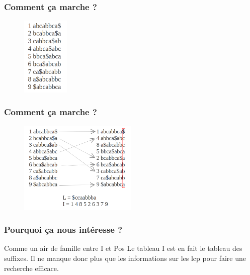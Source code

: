 \documentclass[10pt]{beamer}
\begin{document}
\begin{frame}
  \frametitle{Comment ça marche ?}
  \begin{figure}
    \includegraphics[width=0.2\textwidth]{3_burrows}
  \end{figure}

\end{frame}

\begin{frame}
  \frametitle{Comment ça marche ?}
  \begin{figure}
    \includegraphics[width=0.5\textwidth]{full_burrows}
  \end{figure}

\end{frame}

\begin{frame}
  \frametitle{Pourquoi ça nous intéresse ?}

  \begin{block}{Comme un air de famille entre I et Pos}
    Le tableau I est en fait le tableau des suffixes.
    Il ne manque donc plus que les informations sur les lcp pour faire
    une recherche efficace.
  \end{block}

\end{frame}
\end{document}

